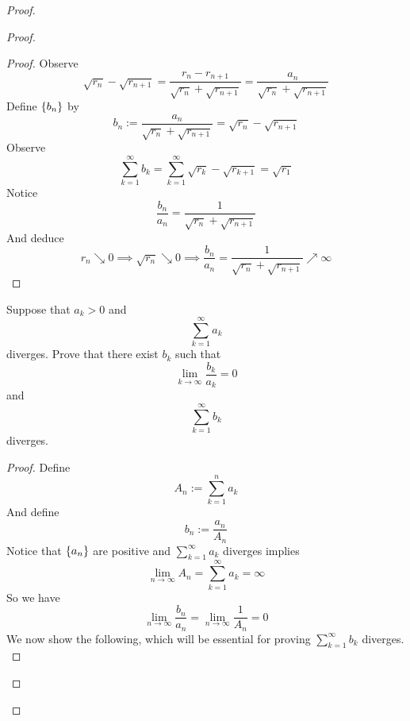 \documentclass{report}
\begin{document}
\begin{proof}
\begin{proof}
\begin{proof}
Observe
\begin{equation}
\sqrt{r_n} -\sqrt{r_{n+1}}=\frac{r_n-r_{n+1}}{\sqrt{r_n} +\sqrt{r_{n+1}} }=\frac{a_n}{\sqrt{r_n} +\sqrt{r_{n+1}} }
\end{equation}
Define $\{ b_n \}$ by
\begin{equation}
b_n:=\frac{a_n}{\sqrt{r_n} +\sqrt{r_{n+1}} }=\sqrt{r_n} -\sqrt{r_{n+1}} 
\end{equation}
Observe
\begin{equation}
\sum_{k=1}^\infty b_k=\sum_{k=1}^\infty \sqrt{r_k} -\sqrt{r_{k+1}}=\sqrt{r_1}  
\end{equation}
Notice 
\begin{equation}
\frac{b_n}{a_n}=\frac{1}{\sqrt{r_n} +\sqrt{r_{n+1}} }
\end{equation}
And deduce
\begin{equation}
r_n\searrow 0\implies \sqrt{r_n} \searrow 0\implies \frac{b_n}{a_n}=\frac{1}{\sqrt{r_n} +\sqrt{r_{n+1}} }\nearrow \infty
\end{equation}
\end{proof}
\begin{question}{}{}
Suppose that \( a_k > 0 \) and 
\[
\sum_{k=1}^{\infty} a_k
\]
diverges. Prove that there exist \( b_k \) such that 
\[
\lim_{k \to \infty} \frac{b_k}{a_k} = 0
\]
and 
\[
\sum_{k=1}^{\infty} b_k
\]
diverges.
\end{question}
\begin{proof}
Define
\begin{equation}
A_n:= \sum_{k=1}^n a_k
\end{equation}
And define
\begin{equation}
b_n:=\frac{a_n}{A_n}
\end{equation}
Notice that $\{ a_n \}$ are positive and $\sum_{k=1}^\infty a_k$ diverges implies 
\begin{equation}
\lim_{n\to\infty}A_n=\sum_{k=1}^\infty a_k=\infty
\end{equation}
So we have
\begin{equation}
\lim_{n\to\infty}\frac{b_n}{a_n}=\lim_{n\to\infty}\frac{1}{A_n}=0
\end{equation}
We now show the following, which will be essential for proving $\sum_{k=1}^\infty b_k$ diverges.\\


\end{proof}
\end{proof}
\end{proof}
\end{document}
